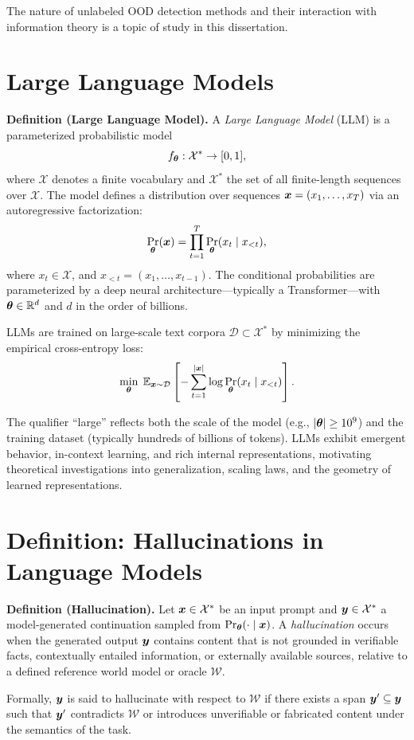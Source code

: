 \documentclass[11pt, oneside]{book}
\newcommand{\cX}{\mathcal{X}}
\newcommand{\cD}{\mathcal{D}}
\theoremstyle{plain}
\theoremstyle{definition}
\theoremstyle{remark}
\begin{document}
The nature of unlabeled OOD detection methods and their interaction with information theory is a topic of study in this dissertation.

\section{Large Language Models}


\textbf{Definition (Large Language Model).}
A \emph{Large Language Model} (LLM) is a parameterized probabilistic model 
\[
f_{\vtheta} : \cX^* \rightarrow [0,1],
\]
where $\cX$ denotes a finite vocabulary and $\cX^*$ the set of all finite-length sequences over $\cX$. The model defines a distribution over sequences ${\bm{x}} = (x_1, \dots, x_T)$ via an autoregressive factorization:
\[
\Pr_{{\bm{\theta}}}({\bm{x}}) = \prod_{t=1}^{T} \Pr_{{\bm{\theta}}}(x_t \mid x_{<t}),
\]
where $x_t \in \cX$, and $x_{<t} = (x_1, \dots, x_{t-1})$. The conditional probabilities are parameterized by a deep neural architecture—typically a Transformer—with ${\bm{\theta}} \in \mathbb{R}^d$ and $d$ in the order of billions.

LLMs are trained on large-scale text corpora $\cD \subset \cX^*$ by minimizing the empirical cross-entropy loss:
\[
\min_{\vtheta} \; \E_{\vx \sim \cD} \left[ - \sum_{t=1}^{|\vx|} \log \Pr_{\vtheta}(x_t \mid x_{<t}) \right].
\]

The qualifier ``large'' reflects both the scale of the model (e.g., $|{\bm{\theta}}| \geq 10^9$) and the training dataset (typically hundreds of billions of tokens). LLMs exhibit emergent behavior, in-context learning, and rich internal representations, motivating theoretical investigations into generalization, scaling laws, and the geometry of learned representations.


\section*{Definition: Hallucinations in Language Models}

\textbf{Definition (Hallucination).}
Let $\vx \in \cX^*$ be an input prompt and $\vy \in \cX^*$ a model-generated continuation sampled from $\Pr_{{\bm{\theta}}}(\cdot \mid {\bm{x}})$. A \emph{hallucination} occurs when the generated output ${\bm{y}}$ contains content that is not grounded in verifiable facts, contextually entailed information, or externally available sources, relative to a defined reference world model or oracle $\mathcal{W}$.

Formally, ${\bm{y}}$ is said to hallucinate with respect to $\mathcal{W}$ if there exists a span ${\bm{y}}' \subseteq {\bm{y}}$ such that ${\bm{y}}'$ contradicts $\mathcal{W}$ or introduces unverifiable or fabricated content under the semantics of the task.
\end{document}
